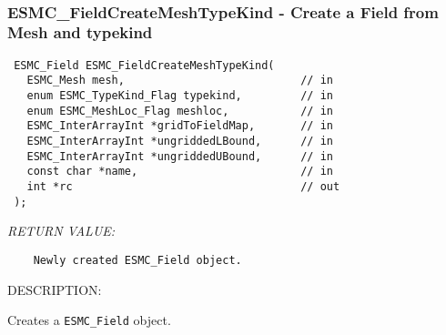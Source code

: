  
\mbox{}\hrulefill\ 
 
\subsubsection [ESMC\_FieldCreateMeshTypeKind] {ESMC\_FieldCreateMeshTypeKind - Create a Field from Mesh and typekind}


  
\begin{verbatim} ESMC_Field ESMC_FieldCreateMeshTypeKind(
   ESMC_Mesh mesh,                           // in
   enum ESMC_TypeKind_Flag typekind,         // in
   enum ESMC_MeshLoc_Flag meshloc,           // in
   ESMC_InterArrayInt *gridToFieldMap,       // in
   ESMC_InterArrayInt *ungriddedLBound,      // in
   ESMC_InterArrayInt *ungriddedUBound,      // in
   const char *name,                         // in
   int *rc                                   // out
 );
 \end{verbatim}{\em RETURN VALUE:}
\begin{verbatim}    Newly created ESMC_Field object.\end{verbatim}
{\sf DESCRIPTION:\\ }


  
    Creates a {\tt ESMC\_Field} object.
  
